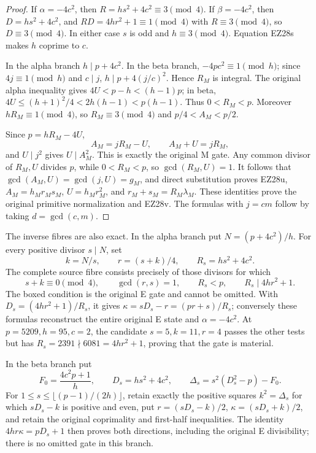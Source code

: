 \documentclass[11pt]{article}
\theoremstyle{definition}\newtheorem{definition}[theorem]{Definition}
\theoremstyle{remark}\newtheorem{remark}[theorem]{Remark}
\begin{document}
\begin{proof}
If \(\alpha=-4c^2\), then \(R=hs^2+4c^2\equiv3\pmod4\).  If
\(\beta=-4c^2\), then \(D=hs^2+4c^2\), and
\(RD=4hr^2+1\equiv1\pmod4\) with \(R\equiv3\pmod4\), so
\(D\equiv3\pmod4\).  In either case \(s\) is odd and \(h\equiv3\pmod4\).
Equation EZ28s makes \(h\) coprime to \(c\).

In the alpha branch \(h\mid p+4c^2\).  In the beta branch,
\(-4pc^2\equiv1\pmod h\); since \(4j\equiv1\pmod h\) and \(c\mid j\),
\(h\mid p+4(j/c)^2\).  Hence \(R_M\) is integral.  The original alpha
inequality gives \(4U<p-h<(h-1)p\); in beta,
\(4U\le(h+1)^2/4<2h(h-1)<p(h-1)\).  Thus \(0<R_M<p\).  Moreover
\(hR_M\equiv1\pmod4\), so \(R_M\equiv3\pmod4\) and
\(p/4<A_M<p/2\).

Since \(p=hR_M-4U\),
\[
 A_M=jR_M-U,\qquad A_M+U=jR_M,
\]
and \(U\mid j^2\) gives \(U\mid A_M^2\).  This is exactly the original M
gate.  Any common divisor of \(R_M,U\) divides \(p\), while
\(0<R_M<p\), so \(\gcd(R_M,U)=1\).  It follows that
\(\gcd(A_M,U)=\gcd(j,U)=g_M\), and direct substitution proves EZ28u,
\(A_M=h_Mr_Ms_M\), \(U=h_Mr_M^2\), and
\(r_M+s_M=R_M\lambda_M\).  These identities prove the original primitive
normalization and EZ28v.  The formulas with \(j=cm\) follow by taking
\(d=\gcd(c,m)\).
\end{proof}

The inverse fibres are also exact.  In the alpha branch put
\(N=(p+4c^2)/h\).  For every positive divisor \(s\mid N\), set
\begin{equation}
 k=N/s,\qquad r=(s+k)/4,\qquad R_s=hs^2+4c^2.          \tag{EZ28w}
\end{equation}
The complete source fibre consists precisely of those divisors for which
\begin{equation}
 s+k\equiv0\pmod4,\qquad\gcd(r,s)=1,\qquad R_s<p,
 \qquad\boxed{R_s\mid4hr^2+1}.                         \tag{EZ28x}
\end{equation}
The boxed condition is the original E gate and cannot be omitted.  With
\(D_s=(4hr^2+1)/R_s\), it gives
\(\kappa=sD_s-r=(pr+s)/R_s\); conversely these formulas reconstruct the
entire original E state and \(\alpha=-4c^2\).  At \(p=5209,h=95,c=2\), the
candidate \(s=5,k=11,r=4\) passes the other tests but has
\(R_s=2391\nmid6081=4hr^2+1\), proving that the gate is material.

In the beta branch put
\begin{equation}
 F_0=\frac{4c^2p+1}{h},\qquad D_s=hs^2+4c^2,\qquad
 \Delta_s=s^2(D_s^2-p)-F_0.                            \tag{EZ28y}
\end{equation}
For \(1\le s\le\lfloor(p-1)/(2h)\rfloor\), retain exactly the positive
squares \(k^2=\Delta_s\) for which \(sD_s-k\) is positive and even, put
\(r=(sD_s-k)/2\), \(\kappa=(sD_s+k)/2\), and retain the original coprimality
and first-half inequalities.  The identity
\(4hr\kappa=pD_s+1\) then proves both directions, including the original E
divisibility; there is no omitted gate in this branch.
\end{document}
